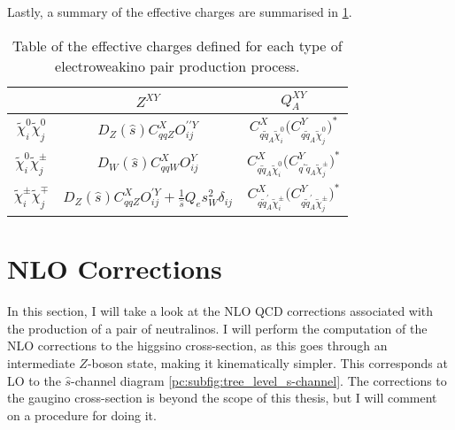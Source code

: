 \documentclass[../main.tex]{subfiles}
\begin{document}
Lastly, a summary of the effective charges are summarised in \cref{pc:tab:eff_charges}.

{\renewcommand{\arraystretch}{2}
\begin{table}
  \centering
  \begin{tabular}{|c|cc|}
    \hline
                                          & \(Z^{XY}\)                                                                             & \(Q_A^{XY}\)                                                                                                   \\
    \hline
    \(\tilde\chi^0_i \tilde\chi^0_j\)     & \(D_Z(\hat{s}) C_{qqZ}^X O_{ij}^{\prime\prime Y}\)                                     & \(C_{q\tilde{q}_A \tilde\chi^0_i}^X \bigl(C_{q\tilde{q}_A \tilde\chi^0_j}^Y\bigr)^{\!\ast}\)                   \\
    \(\tilde\chi^0_i \tilde\chi^\pm_j\)   & \(D_W(\hat{s}) C_{qqW}^X O_{ij}^{Y}\)                                                  & \(C_{q\tilde{q}_A \tilde\chi^0_i}^X \bigl(C_{q^\prime \tilde{q}_A \tilde\chi^\pm_j}^Y\bigr)^{\!\ast}\)         \\
    \(\tilde\chi^\pm_i \tilde\chi^\mp_j\) & \(D_Z(\hat{s}) C_{qqZ}^X O_{ij}^{\prime Y} + \frac{1}{\hat{s}} Q_e s_W^2 \delta_{ij}\) & \(C_{q\tilde{q}^\prime_A \tilde\chi^\pm_i}^X \bigl(C_{q\tilde{q}^\prime_A \tilde\chi^\pm_j}^Y\bigr)^{\!\ast}\) \\
    \hline
  \end{tabular}
  \caption{Table of the effective charges defined for each type of electroweakino pair production process.}
  \label{pc:tab:eff_charges}
\end{table}


}



\section{NLO Corrections}
In this section, I will take a look at the NLO QCD corrections associated with the production of a pair of neutralinos.
I will perform the computation of the NLO corrections to the higgsino cross-section, as this goes through an intermediate \(Z\)-boson state, making it kinematically simpler.
This corresponds at LO to the \(\hat{s}\)-channel diagram \cref{pc:subfig:tree_level_s-channel}.
The corrections to the gaugino cross-section is beyond the scope of this thesis, but I will comment on a procedure for doing it.
\end{document}
